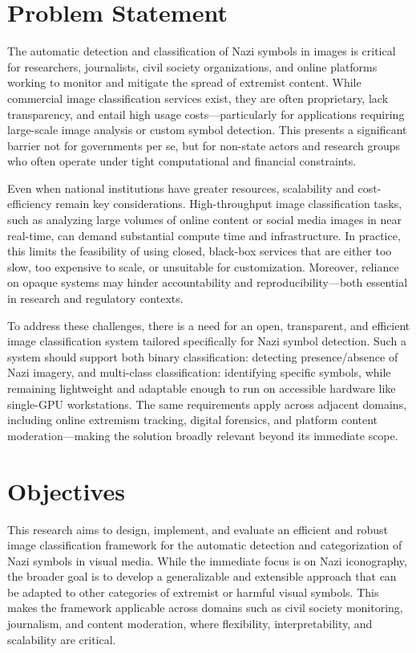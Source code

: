 \section{Problem Statement}

The automatic detection and classification of Nazi symbols in images is critical for researchers, journalists, civil
society organizations, and online platforms working to monitor and mitigate the spread of extremist content. While
commercial image classification services exist, they are often proprietary, lack transparency, and entail high usage
costs—particularly for applications requiring large-scale image analysis or custom symbol detection. This presents a
significant barrier not for governments per se, but for non-state actors and research groups who often operate under
tight computational and financial constraints.

Even when national institutions have greater resources, scalability and cost-efficiency remain key considerations.
High-throughput image classification tasks, such as analyzing large volumes of online content or social media images
in near real-time, can demand substantial compute time and infrastructure. In practice, this limits the feasibility
of using closed, black-box services that are either too slow, too expensive to scale, or unsuitable for
customization. Moreover, reliance on opaque systems may hinder accountability and reproducibility—both essential in
research and regulatory contexts.

To address these challenges, there is a need for an open, transparent, and efficient image classification system
tailored specifically for Nazi symbol detection. Such a system should support both binary classification: detecting
presence/absence of Nazi imagery, and multi-class classification: identifying specific symbols, while remaining
lightweight and adaptable enough to run on accessible hardware like single-GPU workstations. The same requirements
apply across adjacent domains, including online extremism tracking, digital forensics, and platform content
moderation—making the solution broadly relevant beyond its immediate scope.

\section{Objectives}

This research aims to design, implement, and evaluate an efficient and robust image classification framework for the
automatic detection and categorization of Nazi symbols in visual media. While the immediate focus is on Nazi
iconography, the broader goal is to develop a generalizable and extensible approach that can be adapted to other
categories of extremist or harmful visual symbols. This makes the framework applicable across domains such as civil
society monitoring, journalism, and content moderation, where flexibility, interpretability, and scalability are
critical.

